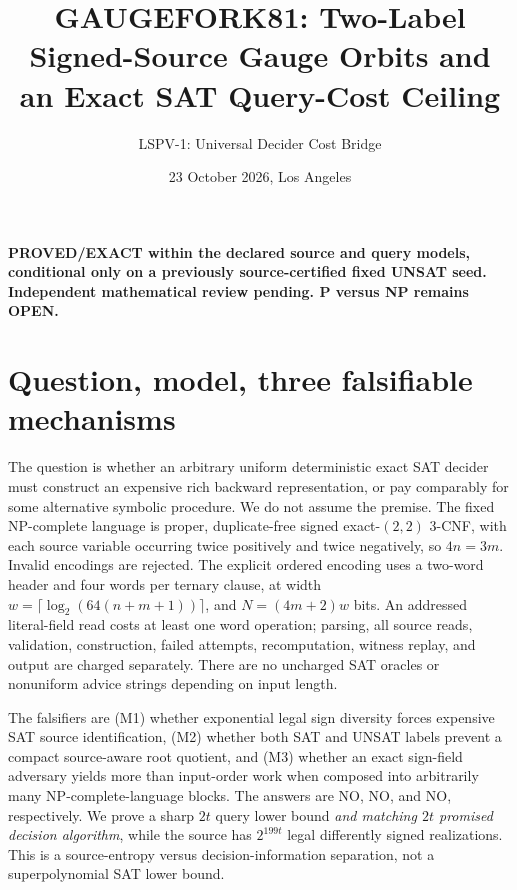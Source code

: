 \documentclass[11pt]{article}
\title{GAUGEFORK81: Two-Label Signed-Source Gauge Orbits and an Exact SAT Query-Cost Ceiling}
\author{LSPV-1: Universal Decider Cost Bridge}
\date{23 October 2026, Los Angeles}
\begin{document}
\maketitle
\begin{center}
\textbf{PROVED/EXACT within the declared source and query models, conditional only on a previously source-certified fixed UNSAT seed.}\\
\textbf{Independent mathematical review pending. P versus NP remains OPEN.}
\end{center}

\section{Question, model, three falsifiable mechanisms}
The question is whether an arbitrary uniform deterministic exact SAT decider must construct an expensive rich backward representation, or pay comparably for some alternative symbolic procedure. We do not assume the premise. The fixed NP-complete language is proper, duplicate-free signed exact-$(2,2)$ 3-CNF, with each source variable occurring twice positively and twice negatively, so $4n=3m$. Invalid encodings are rejected. The explicit ordered encoding uses a two-word header and four words per ternary clause, at width $w=\lceil\log_2(64(n+m+1))\rceil$, and $N=(4m+2)w$ bits. An addressed literal-field read costs at least one word operation; parsing, all source reads, validation, construction, failed attempts, recomputation, witness replay, and output are charged separately. There are no uncharged SAT oracles or nonuniform advice strings depending on input length.

The falsifiers are (M1) whether exponential legal sign diversity forces expensive SAT source identification, (M2) whether both SAT and UNSAT labels prevent a compact source-aware root quotient, and (M3) whether an exact sign-field adversary yields more than input-order work when composed into arbitrarily many NP-complete-language blocks. The answers are NO, NO, and NO, respectively. We prove a sharp $2t$ query lower bound \emph{and matching $2t$ promised decision algorithm}, while the source has $2^{199t}$ legal differently signed realizations. This is a source-entropy versus decision-information separation, not a superpolynomial SAT lower bound.
\end{document}
